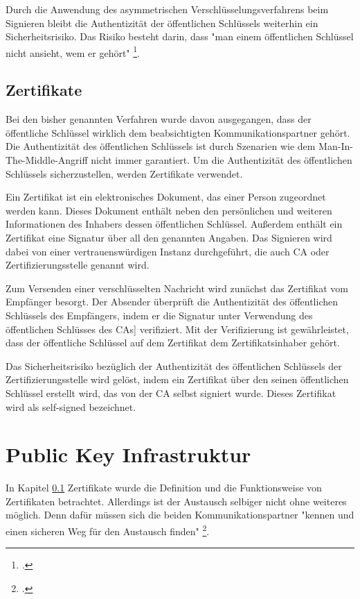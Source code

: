 \documentclass  [paper=a4,
				fontsize=12pt,
				listof=totoc,
				bibliography=totoc
				]{scrreprt}
\begin{document}
				Durch die Anwendung des asymmetrischen Verschlüsselungsverfahrens beim Signieren bleibt die Authentizität der öffentlichen Schlüssels weiterhin ein Sicherheitsrisiko. Das Risiko besteht darin, dass	"man einem öffentlichen Schlüssel nicht ansieht, wem er gehört" \footcite[S. 506]{Schmeh2013}.
	
			\subsection{Zertifikate}\label{chp: zertifikate}
				Bei den bisher genannten Verfahren wurde davon ausgegangen, dass der öffentliche Schlüssel wirklich dem beabsichtigten Kommunikationspartner gehört. Die Authentizität des öffentlichen Schlüssels ist durch Szenarien wie dem Man-In-The-Middle-Angriff nicht immer garantiert. Um die Authentizität des öffentlichen Schlüssels sicherzustellen, werden Zertifikate verwendet.
				
				Ein Zertifikat ist ein elektronisches Dokument, das einer Person zugeordnet werden kann. Dieses Dokument enthält neben den persönlichen und weiteren Informationen des Inhabers dessen öffentlichen Schlüssel. Außerdem enthält ein Zertifikat eine Signatur über all den genannten Angaben. Das Signieren wird dabei von einer vertrauenswürdigen Instanz durchgeführt, die auch \ac{CA} oder Zertifizierungsstelle genannt wird.
				
				Zum Versenden einer verschlüsselten Nachricht wird zunächst das Zertifikat vom Empfänger besorgt. Der Absender überprüft die Authentizität des öffentlichen Schlüssels des Empfängers, indem er die Signatur unter Verwendung des öffentlichen Schlüsses des \ac{CA}s] verifiziert. Mit der Verifizierung ist gewährleistet, dass der öffentliche Schlüssel auf dem Zertifikat dem Zertifikatsinhaber gehört.
				
				Das Sicherheitsrisiko bezüglich der Authentizität des öffentlichen Schlüssels der Zertifizierungsstelle wird gelöst, indem ein Zertifikat über den seinen öffentlichen Schlüssel erstellt wird, das von der \ac{CA} selbst signiert wurde. Dieses Zertifikat wird als self-signed bezeichnet.
	
		\section{Public Key Infrastruktur}
			In Kapitel \ref*{chp: zertifikate} Zertifikate wurde die Definition und die Funktionsweise von Zertifikaten betrachtet. Allerdings ist der Austausch selbiger nicht ohne weiteres möglich. Denn dafür müssen sich die beiden Kommunikationspartner "kennen und einen sicheren Weg für den Austausch finden" \footcite{BSI}.\medskip\\
			
\end{document}
